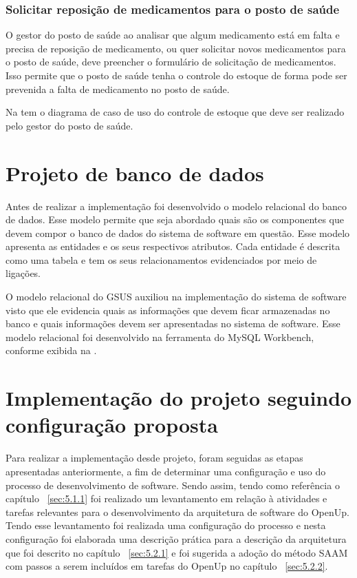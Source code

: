 \subsubsection{Solicitar reposição de medicamentos para o posto de saúde}

O gestor do posto de saúde ao analisar que algum medicamento está em falta e precisa de reposição de medicamento, ou quer solicitar novos medicamentos para o posto de saúde, deve preencher o formulário de solicitação de medicamentos. Isso permite que o posto de saúde tenha o controle do estoque de forma pode ser prevenida a falta de medicamento no posto de saúde.

Na  tem o diagrama de caso de uso do controle de estoque que deve ser realizado pelo gestor do posto de saúde.

%

\section{Projeto de banco de dados}

Antes de realizar a implementação foi desenvolvido o modelo relacional do banco de dados. Esse modelo permite que seja abordado quais são os componentes que devem compor o banco de dados do sistema de software em questão. Esse modelo apresenta as entidades e os seus respectivos atributos. Cada entidade é descrita como uma tabela e tem os seus relacionamentos evidenciados por meio de ligações.

O modelo relacional do GSUS auxiliou na implementação do sistema de software visto que ele evidencia quais as informações que devem ficar armazenadas no banco e quais informações devem ser apresentadas no sistema de software. Esse modelo relacional foi desenvolvido na ferramenta do MySQL Workbench, conforme exibida na .


%


\section{Implementação do projeto seguindo configuração proposta}
\label{sec:implementação}
Para realizar a implementação desde projeto, foram seguidas as etapas apresentadas anteriormente, a fim de determinar uma configuração e uso do processo de desenvolvimento de software.
Sendo assim, tendo como referência o capítulo  ~\ref{sec:5.1.1} foi realizado um levantamento em relação à atividades e tarefas relevantes para o desenvolvimento da arquitetura de software do \acrfull{OpenUp}. Tendo esse levantamento foi realizada uma configuração do processo e nesta configuração foi elaborada uma descrição prática para a descrição da arquitetura que foi descrito no capítulo ~\ref{sec:5.2.1} e foi sugerida a adoção do método \acrfull{SAAM} com passos a serem incluídos em tarefas do \acrfull{OpenUp} no capítulo ~\ref{sec:5.2.2}. 

